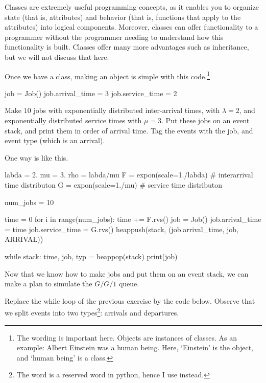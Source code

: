 Classes are extremely useful programming concepts, as it enables you to organize state (that is, attributes) and behavior (that is, functions that apply to the attributes) into logical components. Moreover, classes can offer functionality to a programmer without the programmer needing to understand how this functionality is built. Classes offer many more advantages such as inheritance, but we will not discuss that here. 

Once we have a class, making an object is simple with this code.\footnote{The wording is important here. Objects are instances of classes. As an example: Albert Einstein was a human being. Here, `Einstein' is the object, and `human being' is a class.}

\begin{pyverbatim}
job = Job()
job.arrival_time = 3
job.service_time = 2
\end{pyverbatim}

\begin{exercise}\label{ex:3}
  Make $10$ jobs with exponentially distributed inter-arrival times, with $\lambda=2$,  and exponentially distributed service times with $\mu=3$. Put these jobs on an event stack, and print them in order of arrival time. Tag the events with the job, and event type (which is an arrival).
  \begin{solution}
One way is like this.     
    \begin{pyverbatim}
labda = 2.
mu = 3.
rho = labda/mu
F = expon(scale=1./labda)  # interarrival time distributon
G = expon(scale=1./mu)  # service time distributon

num_jobs = 10

time = 0
for i in range(num_jobs):
    time += F.rvs()
    job = Job()
    job.arrival_time = time
    job.service_time = G.rvs()
    heappush(stack, (job.arrival_time, job, ARRIVAL))


while stack:
    time, job, typ = heappop(stack)
    print(job)
    
    \end{pyverbatim}
  \end{solution}
\end{exercise}

Now that we know how to make jobs and put them on an event stack, we can make a plan to simulate the $G/G/1$ queue. 

  Replace the while loop of the previous exercise by the code below. Observe that we split events into two types\footnote{The word  is a reserved word in python, hence I use  instead.}: arrivals and departures. 

